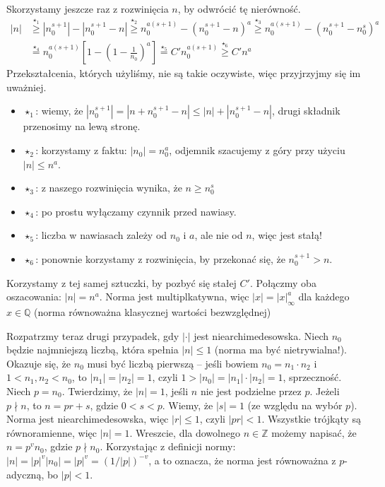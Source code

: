\documentclass[a4paper,fleqn,9pt]{extarticle}
\newenvironment{itemx}{\begin{itemize}
	\setlength{\itemsep}{0pt}
	\setlength{\parskip}{0pt}
	\setlength{\parsep}{0pt}}
{\end{itemize}}
\begin{document}
Skorzystamy jeszcze raz z rozwinięcia $n$, by odwrócić tę nierówność.
\begin{align*}
|n| & \overset{\star_1}{\ge}
\left|n_0^{s+1}\right| - \left|n_0^{s+1} - n\right| \overset{\star_2}{\ge}
n_0^{a(s+1)} - \left(n_0^{s+1} - n\right)^a \overset{\star_3}{\ge} 
n_0^{a(s+1)} - \left(n_0^{s+1} - n_0^s\right)^a \\ & \overset{\star_4}{=}
n_0^{a(s+1)} \left[1 - \left( 1 - \frac{1}{n_0}\right)^a\right] \overset{\star_5}{=}
C' n_0^{a(s+1)} \overset{\star_6}{\ge}
C' n^a 
\end{align*}
Przekształcenia, których użyliśmy, nie są takie oczywiste, więc przyjrzyjmy się im uważniej.
\begin{itemx}
\item $\star_1$: wiemy, że $|n_0^{s+1}| = |n+n_0^{s+1}-n| \le |n| + |n_0^{s+1} - n|$, drugi składnik przenosimy na lewą stronę.
\item $\star_2$: korzystamy z faktu: $|n_0| = n_0^a$, odjemnik szacujemy z góry przy użyciu $| n| \le n^a$.
\item $\star_3$: z naszego rozwinięcia wynika, że $n \ge n_0^s$
\item $\star_4$: po prostu wyłączamy czynnik przed nawiasy.
\item $\star_5$: liczba w nawiasach zależy od $n_0$ i $a$, ale nie od $n$, więc jest stałą!
\item $\star_6$: ponownie korzystamy z rozwinięcia, by przekonać się, że $n_0^{s+1} > n$.
\end{itemx}

Korzystamy z tej samej sztuczki, by pozbyć się stałej $C'$. 
Połączmy oba oszacowania: $|n| = n^a$.
Norma jest multiplkatywna, więc $|x| = |x|_\infty^a$ dla każdego $x\in\mathbb Q$ (norma równoważna klasycznej wartości bezwzględnej)

Rozpatrzmy teraz drugi przypadek, gdy $|\cdot|$ jest niearchimedesowska.
Niech $n_0$ będzie najmniejszą liczbą, która spełnia $|n| \le 1$ (norma ma być nietrywialna!).
Okazuje się, że $n_0$ musi być liczbą pierwszą -- jeśli bowiem $n_0 = n_1 \cdot n_2$ i $1 < n_1, n_2 < n_0$, to $|n_1| = |n_2| = 1$, czyli $1 > |n_0| = |n_1| \cdot |n_2| = 1$, sprzeczność.
Niech $p = n_0$.
Twierdzimy, że $|n| = 1$, jeśli $n$ nie jest podzielne przez $p$.
Jeżeli $p\nmid n$, to $n = pr+s$, gdzie $0 < s < p$.
Wiemy, że $|s| = 1$ (ze względu na wybór $p$).
Norma jest niearchimedesowska, więc $|r| \le 1$, czyli $|pr| < 1$.
Wszystkie trójkąty są równoramienne, więc $|n| = 1$. 
Wreszcie, dla dowolnego $n\in\mathbb Z$ możemy napisać, że $n = p^vn_0$, gdzie $p\nmid n_0$.
Korzystając z definicji normy: $|n| = |p|^v |n_0| = |p|^v = (1/|p|)^{-v}$, a to oznacza, że norma jest równoważna z $p$-adyczną, bo $|p| < 1$.
\end{document}

